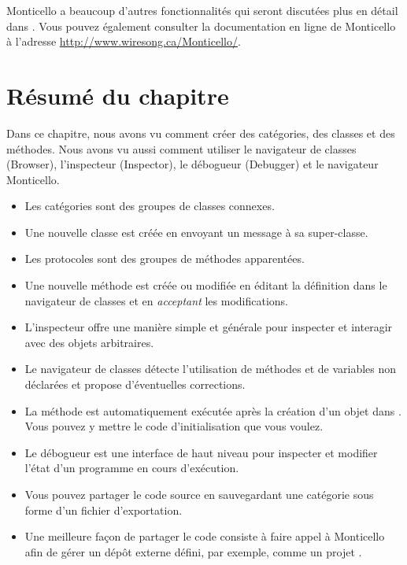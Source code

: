 \documentclass[a4paper,10pt,twoside]{book}
\begin{document}

Monticello a beaucoup d'autres fonctionnalités qui seront discutées
plus en détail dans .
Vous pouvez également consulter la documentation en ligne de
Monticello à l'adresse \url{http://www.wiresong.ca/Monticello/}.

\section{Résumé du chapitre}
Dans ce chapitre, nous avons vu comment créer des catégories, des classes
et des méthodes. Nous avons vu aussi comment utiliser le navigateur de
classes (Browser), l'inspecteur (Inspector), le débogueur (Debugger)
et le navigateur Monticello.

\begin{itemize}
  \item Les catégories sont des groupes de classes connexes.
  \item Une nouvelle classe est créée en envoyant un message à sa super-classe.
  \item Les protocoles sont des groupes de méthodes apparentées.
  \item Une nouvelle méthode est créée ou modifiée en éditant la définition dans le navigateur de classes et en \emph{acceptant} les modifications.
  \item L'inspecteur offre une manière simple et générale pour inspecter et interagir avec des objets arbitraires.
  \item Le navigateur de classes détecte l'utilisation de méthodes et de variables non déclarées et propose d'éventuelles corrections.
  \item La méthode  est automatiquement exécutée après
    la création d'un objet dans \pharo. Vous pouvez y mettre
    le code d'initialisation que vous voulez.
  \item Le débogueur est une interface de haut niveau pour inspecter et modifier l'état d'un programme en cours d'exécution.
  \item Vous pouvez partager le code source en sauvegardant une
    catégorie sous forme d'un fichier d'exportation.
  \item Une meilleure façon de partager le code consiste à faire
    appel à Monticello afin de gérer un dépôt externe défini, par
    exemple, comme un projet \sqsrc.
\end{itemize}

\ifx\wholebook\relax\else
\end{document}
